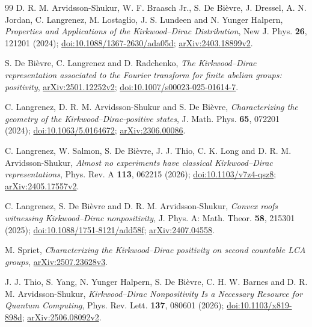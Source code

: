 \documentclass[11pt,a4paper]{article}
\theoremstyle{definition}
\theoremstyle{plain}
\begin{document}
\begingroup\small
\begin{thebibliography}{99}
\setlength{\itemsep}{2pt}
D. R. M. Arvidsson-Shukur, W. F. Braasch Jr., S. De Bi\`evre, J. Dressel,
A. N. Jordan, C. Langrenez, M. Lostaglio, J. S. Lundeen and N. Yunger Halpern,
\emph{Properties and Applications of the Kirkwood--Dirac Distribution},
New J. Phys. \textbf{26}, 121201 (2024);
\href{https://doi.org/10.1088/1367-2630/ada05d}{doi:10.1088/1367-2630/ada05d};
\href{https://arxiv.org/abs/2403.18899v2}{arXiv:2403.18899v2}.

S. De Bi\`evre, C. Langrenez and D. Radchenko,
\emph{The Kirkwood--Dirac representation associated to the Fourier transform
for finite abelian groups: positivity},
\href{https://arxiv.org/abs/2501.12252v2}{arXiv:2501.12252v2};
\href{https://doi.org/10.1007/s00023-025-01614-7}{doi:10.1007/s00023-025-01614-7}.

C. Langrenez, D. R. M. Arvidsson-Shukur and S. De Bi\`evre,
\emph{Characterizing the geometry of the Kirkwood--Dirac-positive states},
J. Math. Phys. \textbf{65}, 072201 (2024);
\href{https://doi.org/10.1063/5.0164672}{doi:10.1063/5.0164672};
\href{https://arxiv.org/abs/2306.00086}{arXiv:2306.00086}.

C. Langrenez, W. Salmon, S. De Bi\`evre, J. J. Thio, C. K. Long and
D. R. M. Arvidsson-Shukur,
\emph{Almost no experiments have classical Kirkwood--Dirac representations},
Phys. Rev. A \textbf{113}, 062215 (2026);
\href{https://doi.org/10.1103/v7z4-qsz8}{doi:10.1103/v7z4-qsz8};
\href{https://arxiv.org/abs/2405.17557v2}{arXiv:2405.17557v2}.

C. Langrenez, S. De Bi\`evre and D. R. M. Arvidsson-Shukur,
\emph{Convex roofs witnessing Kirkwood--Dirac nonpositivity},
J. Phys. A: Math. Theor. \textbf{58}, 215301 (2025);
\href{https://doi.org/10.1088/1751-8121/add58f}{doi:10.1088/1751-8121/add58f};
\href{https://arxiv.org/abs/2407.04558}{arXiv:2407.04558}.

M. Spriet,
\emph{Characterizing the Kirkwood--Dirac positivity on second countable LCA groups},
\href{https://arxiv.org/abs/2507.23628v3}{arXiv:2507.23628v3}.

J. J. Thio, S. Yang, N. Yunger Halpern, S. De Bi\`evre, C. H. W. Barnes
and D. R. M. Arvidsson-Shukur,
\emph{Kirkwood--Dirac Nonpositivity Is a Necessary Resource for Quantum Computing},
Phys. Rev. Lett. \textbf{137}, 080601 (2026);
\href{https://doi.org/10.1103/x819-898d}{doi:10.1103/x819-898d};
\href{https://arxiv.org/abs/2506.08092v2}{arXiv:2506.08092v2}.


\end{thebibliography}
\end{document}
